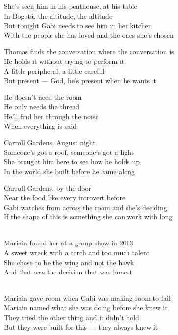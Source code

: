 \begin{lyrics}
She's seen him in his penthouse, at his table\\
In Bogotá, the altitude, the altitude\\
But tonight Gabi needs to see him in her kitchen\\
With the people she has loved and the ones she's chosen

Thomas finds the conversation where the conversation is\\
He holds it without trying to perform it\\
A little peripheral, a little careful\\
But present — God, he's present when he wants it

He doesn't need the room\\
He only needs the thread\\
He'll find her through the noise\\
When everything is said

Carroll Gardens, August night\\
Someone's got a roof, someone's got a light\\
She brought him here to see how he holds up\\
In the world she built before he came along

Carroll Gardens, by the door\\
Near the food like every introvert before\\
Gabi watches from across the room and she's deciding\\
If the shape of this is something she can work with long

\\
Mariain found her at a group show in 2013\\
A sweet wreck with a torch and too much talent\\
She chose to be the wing and not the hawk\\
And that was the decision that was honest

\\
Mariain gave room when Gabi was making room to fail\\
Mariain named what she was doing before she knew it\\
They tried the other thing and it didn't hold\\
But they were built for this — they always knew it


\end{lyrics}
